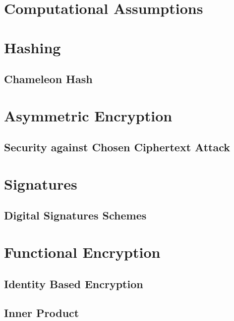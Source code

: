 








\maketitle

\ifTableOfContents 
	\tableofcontents
	\newpage
\fi

\chapter{Computational Assumptions}

\chapter{Hashing}
	\section{Chameleon Hash}
	

\chapter{Asymmetric Encryption}
	\section{Security against Chosen Ciphertext Attack}
	

\chapter{Signatures}
	\section{Digital Signatures Schemes}
	

\chapter{Functional Encryption}
	\section{Identity Based Encryption}
	
	
	
	\section{Inner Product}
	





\appendix


